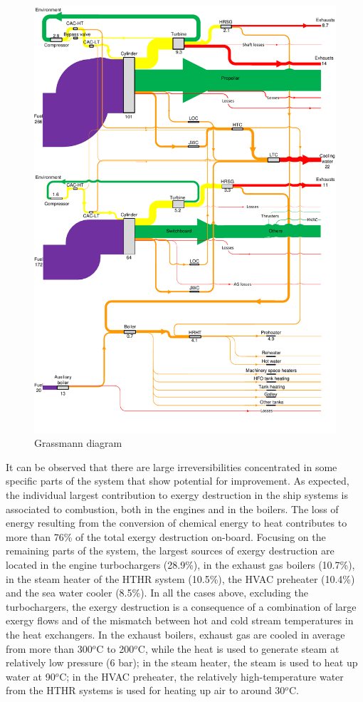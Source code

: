 \documentclass[preprint,12pt]{elsarticle}
\begin{document}
\begin{figure}
	\centering
	\includegraphics[width=0.95\linewidth]{Figures/Grassmann_diagram_v5}
	\caption{Grassmann diagram}
	\label{fig:Grassmann}
\end{figure}

It can be observed that there are large irreversibilities concentrated in some specific parts of the system that show potential for improvement. As expected, the individual largest contribution to exergy destruction in the ship systems is associated to combustion, both in the engines and in the boilers. The loss of energy resulting from the conversion of chemical energy to heat contributes to more than 76\% of the total exergy destruction on-board. Focusing on the remaining parts of the system, the largest sources of exergy destruction are located in the engine turbochargers (28.9\%), in the exhaust gas boilers (10.7\%), in the steam heater of the HTHR system (10.5\%), the HVAC preheater (10.4\%) and the sea water cooler (8.5\%). In all the cases above, excluding the turbochargers, the exergy destruction is a consequence of a combination of large exergy flows and of the mismatch between hot and cold stream temperatures in the heat exchangers. In the exhaust boilers, exhaust gas are cooled in average from more than 300$^o$C to 200$^o$C, while the heat is used to generate steam at relatively low pressure (6 bar); in the steam heater, the steam is used to heat up water at 90$^o$C; in the HVAC preheater, the relatively high-temperature water from the HTHR systems is used for heating up air to around 30$^o$C.
\end{document}
